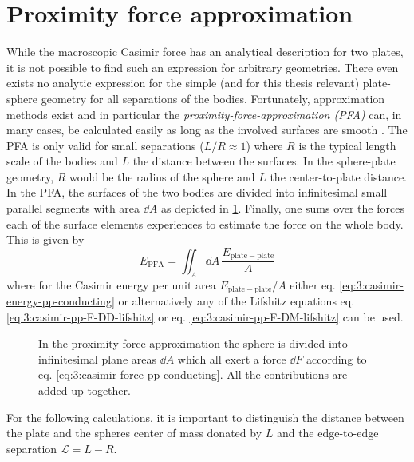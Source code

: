 \section{Proximity force approximation}\label{sec:3:pfa}

While the macroscopic Casimir force has an analytical description for two plates, it is not possible to find such an expression for arbitrary geometries. There even exists no analytic expression for the
simple (and for this thesis relevant) plate-sphere geometry for all separations of the bodies.
Fortunately, approximation methods exist and in particular the \emph{proximity-force-approximation (PFA)} can, in many cases, be calculated easily as long as the involved surfaces are smooth \cite{Hartmann_2018,Emig_2007a,Bulgac_2006}.
The PFA is only valid for small separations ($L/R \approx 1$) where $R$ is the typical length scale of the bodies and $L$ the distance between the surfaces.
In the sphere-plate geometry, $R$ would be the radius of the sphere and $L$ the center-to-plate distance.
In the PFA, the surfaces of the two bodies are divided into infinitesimal small parallel segments with area $\dd A$ as depicted in \cref{fig:3:PFA}.
Finally, one sums over the forces each of the surface elements experiences to estimate the force on the whole body. This is given by
\begin{equation}\label{eq:3:pfa}
  E_\mathrm{PFA} = \iint_A \dd A \, \frac{E_\mathrm{plate-plate}}{A}
\end{equation}
where for the Casimir energy per unit area $E_\mathrm{plate-plate}/A$ either eq. \eqref{eq:3:casimir-energy-pp-conducting} or alternatively any of the Lifshitz equations eq. \eqref{eq:3:casimir-pp-F-DD-lifshitz} or eq. \eqref{eq:3:casimir-pp-F-DM-lifshitz} can be used.
\begin{figure}[!htbp]
  \centering
  \def\svgwidth{0.55\textwidth}
  
  \caption{In the proximity force approximation the sphere is divided into infinitesimal plane areas $\dd A$ which all exert a force $\dd F$ according to eq. \eqref{eq:3:casimir-force-pp-conducting}. All the contributions are added up together.}
  \label{fig:3:PFA}
\end{figure}
For the following calculations, it is important to distinguish the distance between the plate and the spheres center of mass donated by $L$ and the edge-to-edge separation $\mathscr{L} = L - R$.

